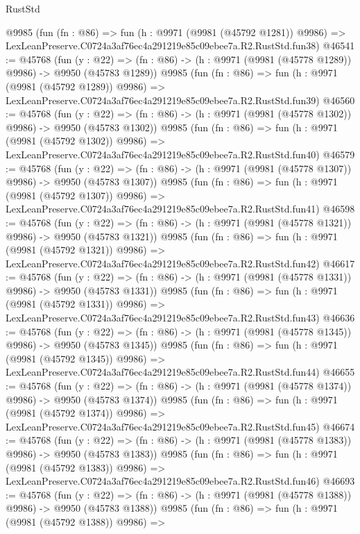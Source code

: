 \begin{lexlean}{RustStd}
\begin{coremodule}
    @9985
    (fun (fn : @86) =>
    fun (h : @9971 (@9981 (@45792 @1281)) @9986) =>
    LexLeanPreserve.C0724a3af76ec4a291219e85c09ebee7a.R2.RustStd.fun38)
@46541 := @45768
    (fun (y : @22) =>
    (fn : @86) -> (h : @9971 (@9981 (@45778 @1289)) @9986) -> @9950 (@45783 @1289))
    @9985
    (fun (fn : @86) =>
    fun (h : @9971 (@9981 (@45792 @1289)) @9986) =>
    LexLeanPreserve.C0724a3af76ec4a291219e85c09ebee7a.R2.RustStd.fun39)
@46560 := @45768
    (fun (y : @22) =>
    (fn : @86) -> (h : @9971 (@9981 (@45778 @1302)) @9986) -> @9950 (@45783 @1302))
    @9985
    (fun (fn : @86) =>
    fun (h : @9971 (@9981 (@45792 @1302)) @9986) =>
    LexLeanPreserve.C0724a3af76ec4a291219e85c09ebee7a.R2.RustStd.fun40)
@46579 := @45768
    (fun (y : @22) =>
    (fn : @86) -> (h : @9971 (@9981 (@45778 @1307)) @9986) -> @9950 (@45783 @1307))
    @9985
    (fun (fn : @86) =>
    fun (h : @9971 (@9981 (@45792 @1307)) @9986) =>
    LexLeanPreserve.C0724a3af76ec4a291219e85c09ebee7a.R2.RustStd.fun41)
@46598 := @45768
    (fun (y : @22) =>
    (fn : @86) -> (h : @9971 (@9981 (@45778 @1321)) @9986) -> @9950 (@45783 @1321))
    @9985
    (fun (fn : @86) =>
    fun (h : @9971 (@9981 (@45792 @1321)) @9986) =>
    LexLeanPreserve.C0724a3af76ec4a291219e85c09ebee7a.R2.RustStd.fun42)
@46617 := @45768
    (fun (y : @22) =>
    (fn : @86) -> (h : @9971 (@9981 (@45778 @1331)) @9986) -> @9950 (@45783 @1331))
    @9985
    (fun (fn : @86) =>
    fun (h : @9971 (@9981 (@45792 @1331)) @9986) =>
    LexLeanPreserve.C0724a3af76ec4a291219e85c09ebee7a.R2.RustStd.fun43)
@46636 := @45768
    (fun (y : @22) =>
    (fn : @86) -> (h : @9971 (@9981 (@45778 @1345)) @9986) -> @9950 (@45783 @1345))
    @9985
    (fun (fn : @86) =>
    fun (h : @9971 (@9981 (@45792 @1345)) @9986) =>
    LexLeanPreserve.C0724a3af76ec4a291219e85c09ebee7a.R2.RustStd.fun44)
@46655 := @45768
    (fun (y : @22) =>
    (fn : @86) -> (h : @9971 (@9981 (@45778 @1374)) @9986) -> @9950 (@45783 @1374))
    @9985
    (fun (fn : @86) =>
    fun (h : @9971 (@9981 (@45792 @1374)) @9986) =>
    LexLeanPreserve.C0724a3af76ec4a291219e85c09ebee7a.R2.RustStd.fun45)
@46674 := @45768
    (fun (y : @22) =>
    (fn : @86) -> (h : @9971 (@9981 (@45778 @1383)) @9986) -> @9950 (@45783 @1383))
    @9985
    (fun (fn : @86) =>
    fun (h : @9971 (@9981 (@45792 @1383)) @9986) =>
    LexLeanPreserve.C0724a3af76ec4a291219e85c09ebee7a.R2.RustStd.fun46)
@46693 := @45768
    (fun (y : @22) =>
    (fn : @86) -> (h : @9971 (@9981 (@45778 @1388)) @9986) -> @9950 (@45783 @1388))
    @9985
    (fun (fn : @86) =>
    fun (h : @9971 (@9981 (@45792 @1388)) @9986) =>

\end{coremodule}
\end{lexlean}
